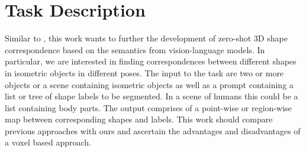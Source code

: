 \section{Task Description}
\label{sec:task_description}

Similar to \citet{abdelreheem_zero-shot_2023}, this work wants to further the development of zero-shot 3D shape correspondence based on the semantics from vision-language models. In particular, we are interested in finding correspondences between different shapes in isometric objects in different poses. The input to the task are two or more objects or a scene containing isometric objects as well as a prompt containing a list or tree of shape labels to be segmented. In a scene of humans this could be a list containing body parts. The output comprises of a point-wise or region-wise map between corresponding shapes and labels.
This work should compare previous approaches with ours and ascertain the advantages and disadvantages of a voxel based approach.